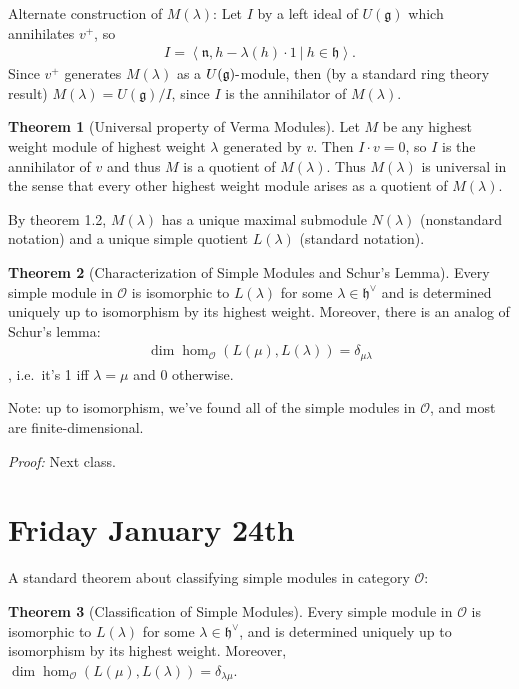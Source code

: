 \documentclass[11pt]{scrartcl}
\theoremstyle{definition}
\theoremstyle{theorem}
\newtheorem{theorem}{Theorem}[section]
\theoremstyle{proof}
\theoremstyle{definition}
\theoremstyle{break}
\theoremstyle{problem}
\newcommand{\dash}[0]{{\hbox{-}}}
\newcommand{\dual}[0]{^\vee}
\newcommand{\generators}[1]{\left\langle{#1}\right\rangle}
\newcommand{\lieg}[0]{{\mathfrak{g}}}
\newcommand{\lieh}[0]{{\mathfrak{h}}}
\newcommand{\lien}[0]{{\mathfrak{n}}}
\newcommand{\OO}[0]{{\mathcal{O}}}
\newcommand{\suchthat}[0]{{~\mathrel{\Big|}~}}
\begin{document}
Alternate construction of \(M(\lambda)\): Let \(I\) by a left ideal of
\(U(\lieg)\) which annihilates \(v^+\), so
\begin{align*}
I = \generators{\lien, h-\lambda(h)\cdot 1 \suchthat h\in\lieh}
.\end{align*} Since \(v^+\) generates \(M(\lambda)\) as a
\(U(\lieg)\dash\)module, then (by a standard ring theory result)
\(M(\lambda) = U(\lieg)/I\), since \(I\) is the annihilator of
\(M(\lambda)\).

\begin{theorem}[Universal property of Verma Modules]

Let \(M\) be any highest weight module of highest weight \(\lambda\)
generated by \(v\). Then \(I\cdot v = 0\), so \(I\) is the annihilator
of \(v\) and thus \(M\) is a quotient of \(M(\lambda)\). Thus
\(M(\lambda)\) is universal in the sense that every other highest weight
module arises as a quotient of \(M(\lambda)\).\end{theorem}

By theorem 1.2, \(M(\lambda)\) has a unique maximal submodule
\(N(\lambda)\) (nonstandard notation) and a unique simple quotient
\(L(\lambda)\) (standard notation).

\begin{theorem}[Characterization of Simple Modules and Schur’s Lemma]

Every simple module in \(\mathcal O\) is isomorphic to \(L(\lambda)\)
for some \(\lambda \in \lieh\dual\) and is determined uniquely up to
isomorphism by its highest weight. Moreover, there is an analog of
Schur's lemma:
\begin{align*}\dim \hom_{\mathcal O}(L(\mu), L(\lambda)) = \delta_{\mu\lambda}\end{align*},
i.e.~it's 1 iff \(\lambda=\mu\) and 0 otherwise.\end{theorem}

Note: up to isomorphism, we've found all of the simple modules in
\(\mathcal O\), and most are finite-dimensional.

\emph{Proof:} Next class.

\hypertarget{friday-january-24th}{%
\section{Friday January 24th}\label{friday-january-24th}}

A standard theorem about classifying simple modules in category \(\OO\):

\begin{theorem}[Classification of Simple Modules]

Every simple module in \(\OO\) is isomorphic to \(L(\lambda)\) for some
\(\lambda \in \lieh\dual\), and is determined uniquely up to isomorphism
by its highest weight. Moreover,
\(\dim \hom_\OO(L(\mu), L(\lambda)) = \delta_{\lambda \mu}\).\end{theorem}
\end{document}
